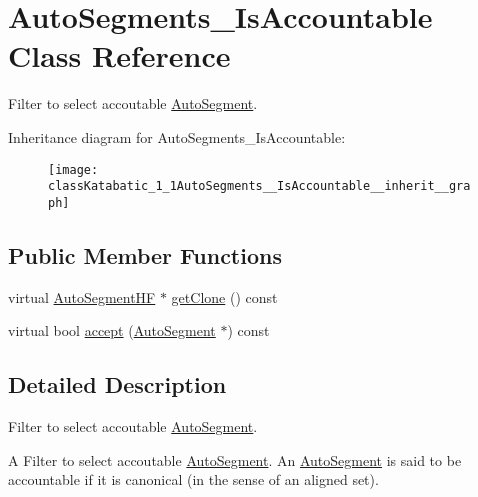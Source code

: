 \hypertarget{classKatabatic_1_1AutoSegments__IsAccountable}{\section{Auto\-Segments\-\_\-\-Is\-Accountable Class Reference}
\label{classKatabatic_1_1AutoSegments__IsAccountable}
}


Filter to select accoutable \hyperlink{classKatabatic_1_1AutoSegment}{Auto\-Segment}.  




Inheritance diagram for Auto\-Segments\-\_\-\-Is\-Accountable\-:\nopagebreak
\begin{figure}[H]
\begin{center}
\leavevmode
\texttt{[image: classKatabatic\_1\_1AutoSegments\_\_IsAccountable\_\_inherit\_\_graph]}
\end{center}
\end{figure}
\subsection*{Public Member Functions}
\begin{DoxyCompactItemize}
\item 
virtual \hyperlink{namespaceKatabatic_a790418bb65a9a13859868df3e8f53598}{Auto\-Segment\-H\-F} $\ast$ \hyperlink{classKatabatic_1_1AutoSegments__IsAccountable_afcbca92b72aff15ded94fe7c815de1ff}{get\-Clone} () const 
\item 
virtual bool \hyperlink{classKatabatic_1_1AutoSegments__IsAccountable_ae826b0a72ecbf23d8c50409892d26759}{accept} (\hyperlink{classKatabatic_1_1AutoSegment}{Auto\-Segment} $\ast$) const 
\end{DoxyCompactItemize}


\subsection{Detailed Description}
Filter to select accoutable \hyperlink{classKatabatic_1_1AutoSegment}{Auto\-Segment}. 

A Filter to select accoutable \hyperlink{classKatabatic_1_1AutoSegment}{Auto\-Segment}. An \hyperlink{classKatabatic_1_1AutoSegment}{Auto\-Segment} is said to be accountable if it is canonical (in the sense of an aligned set). 

